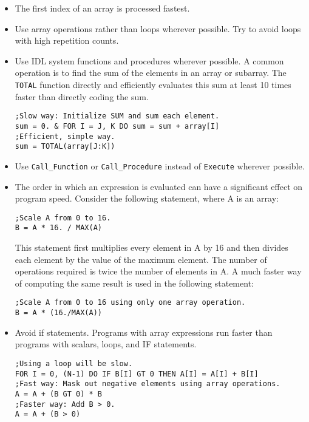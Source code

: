 \documentclass[12pt]{article}
\begin{document}
\begin{itemize}
\item The first index of an array is processed fastest.
\item Use array operations rather than loops wherever possible. Try to avoid loops with high repetition counts.
%
\item Use IDL system functions and procedures wherever possible. A common operation is to find the sum of the elements in an array or subarray. The \texttt{TOTAL} function directly and efficiently evaluates this sum at least 10 times faster than directly coding the sum.
\begin{verbatim}
;Slow way: Initialize SUM and sum each element. 
sum = 0. & FOR I = J, K DO sum = sum + array[I]
;Efficient, simple way.
sum = TOTAL(array[J:K])
\end{verbatim}
%
\item Use \texttt{Call\_Function} or \texttt{Call\_Procedure} instead of \texttt{Execute} wherever possible.
%
\item The order in which an expression is evaluated can have a significant effect on program speed. Consider the following statement, where A is an array:
\begin{verbatim}
;Scale A from 0 to 16.
B = A * 16. / MAX(A)
\end{verbatim}
This statement first multiplies every element in A by 16 and then divides each element by the value of the maximum element. The number of operations required is twice the number of elements in A. A much faster way of computing the same result is used in the following statement:
\begin{verbatim}
;Scale A from 0 to 16 using only one array operation.
B = A * (16./MAX(A))
\end{verbatim}
%
\item Avoid if statements. Programs with array expressions run faster than programs with scalars, loops, and IF statements. 
\begin{verbatim}
;Using a loop will be slow.
FOR I = 0, (N-1) DO IF B[I] GT 0 THEN A[I] = A[I] + B[I]
;Fast way: Mask out negative elements using array operations.
A = A + (B GT 0) * B
;Faster way: Add B > 0.
A = A + (B > 0)
\end{verbatim}


\end{itemize}
\end{document}
